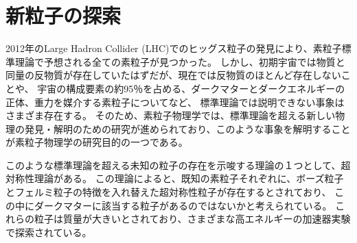 \section{新粒子の探索}
2012年のLarge Hadron Collider (LHC)でのヒッグス粒子の発見により、素粒子標準理論で予想される全ての素粒子が見つかった。
しかし、初期宇宙では物質と同量の反物質が存在していたはずだが、現在では反物質のほとんど存在しないことや、
宇宙の構成要素の約95％を占める、ダークマターとダークエネルギーの正体、重力を媒介する素粒子についてなど、
標準理論では説明できない事象はさまざま存在する。
そのため、素粒子物理学では、標準理論を超える新しい物理の発見・解明のための研究が進められており、このような事象を解明することが素粒子物理学の研究目的の一つである。


このような標準理論を超える未知の粒子の存在を示唆する理論の１つとして、超対称性理論がある。
この理論によると、既知の素粒子それぞれに、ボーズ粒子とフェルミ粒子の特徴を入れ替えた超対称性粒子が存在するとされており、
この中にダークマターに該当する粒子があるのではないかと考えられている。
これらの粒子は質量が大きいとされており、さまざまな高エネルギーの加速器実験で探索されている。

